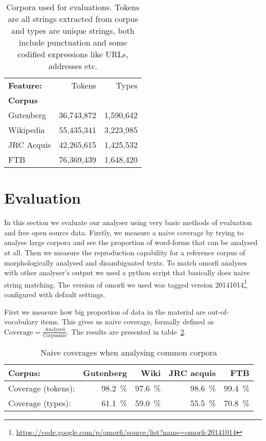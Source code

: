 \documentclass[a4paper,12pt]{article}
\begin{document}
\begin{table}
    \begin{scriptsize}
  \centering
    \begin{tabular}{|l|r|r|}
        \hline
        \bf Feature: & Tokens     & Types     \\
        \bf Corpus   &            &           \\
        \hline
        Gutenberg    & 36,743,872 & 1,590,642 \\
        Wikipedia    & 55,435,341 & 3,223,985 \\
        JRC Acquis   & 42,265,615 & 1,425,532 \\
        FTB          & 76,369,439 & 1,648,420 \\
        \hline
    \end{tabular}
  \caption{Corpora used for evaluations. Tokens are all strings extracted from
      corpus and types are unique strings, both include punctuation and some
      codified expressions like URLs, addresses etc.
  \label{table:corpora}}
  \end{scriptsize}
\end{table}

\section{Evaluation}
\label{sec:evaluation}

In this section we evaluate our analyser using very basic methods of evaluation
and free open source data. Firstly, we measure a naive coverage by trying to
analyse large corpora and see the proportion of word-forms that can be analysed
at all. Then we measure the reproduction capability for a reference corpus of
morphologically analysed and disambiguated texts. To match omorfi analyses with
other analyser's output we used a python script that basically does naive
string matching. The version of omorfi we used was tagged version
20141014\footnote{\url{https://code.google.com/p/omorfi/source/list?name=omorfi-20141014}}
configured with default settings.


First we measure how big proportion of data in the material are
out-of-vocabulary items. This gives us naive coverage, formally defined as
$\mathrm{Coverage} = \frac{\mathrm{Analysed}}{\mathrm{Corpus size}}$.
The results are presented in table~\ref{table:coverage}. 

\begin{table}
    \begin{scriptsize}
    \centering
    \begin{tabular}{|l|r|r|r|r|}
        \hline
        Corpus:            & \bf Gutenberg & \bf Wiki & \bf JRC acquis & \bf FTB \\
        \hline
        Coverage (tokens): & 98.2~\%       & 97.6~\%  & 98.6~\%        & 99.4~\% \\
        Coverage (types):  & 61.1~\%       & 59.0~\%  & 55.5~\%        & 70.8~\% \\
        \hline
    \end{tabular}
    \caption{Naive coverages when analysing common corpora
    \label{table:coverage}}
  \end{scriptsize}
\end{table}
\end{document}
